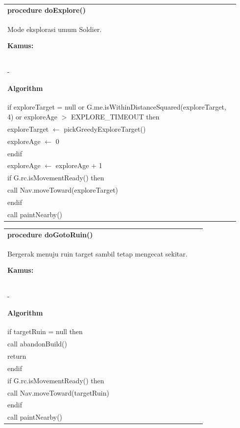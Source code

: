\documentclass{article}
\newenvironment{pseudobox}
{
\centering
\begin{longtable}{|p{0.94\linewidth}|}
\hline
}
{
\\ \hline
\end{longtable}
\vspace{0.05cm}
}
\begin{document}
\begin{pseudobox}
\textbf{procedure doExplore()} \\
{ Mode eksplorasi umum Soldier. }

\textbf{Kamus:} \\
\hspace*{1em} -

\textbf{Algorithm} \\
\hspace*{1em} if exploreTarget = null or G.me.isWithinDistanceSquared(exploreTarget, 4) or exploreAge $>$ EXPLORE\_TIMEOUT then \\
\hspace*{2em} exploreTarget $\leftarrow$ pickGreedyExploreTarget() \\
\hspace*{2em} exploreAge $\leftarrow$ 0 \\
\hspace*{1em} endif \\

\hspace*{1em} exploreAge $\leftarrow$ exploreAge + 1 \\

\hspace*{1em} if G.rc.isMovementReady() then \\
\hspace*{2em} call Nav.moveToward(exploreTarget) \\
\hspace*{1em} endif \\

\hspace*{1em} call paintNearby()
\end{pseudobox}

\begin{pseudobox}
\textbf{procedure doGotoRuin()} \\
{ Bergerak menuju ruin target sambil tetap mengecat sekitar. }

\textbf{Kamus:} \\
\hspace*{1em} -

\textbf{Algorithm} \\
\hspace*{1em} if targetRuin = null then \\
\hspace*{2em} call abandonBuild() \\
\hspace*{2em} return \\
\hspace*{1em} endif \\

\hspace*{1em} if G.rc.isMovementReady() then \\
\hspace*{2em} call Nav.moveToward(targetRuin) \\
\hspace*{1em} endif \\

\hspace*{1em} call paintNearby()
\end{pseudobox}
\end{document}

